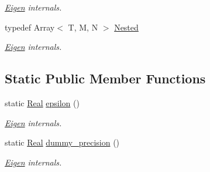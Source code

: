\begin{DoxyCompactItemize}
\begin{DoxyCompactList}\small\item\em \hyperlink{namespace_eigen}{Eigen} internals. \end{DoxyCompactList}\item 
\hypertarget{struct_eigen_1_1_num_traits_3_01_array_3_01_t_00_01_m_00_01_n_01_4_01_4_ae5988a13ff54e94be1f4c785b30ed82b}{typedef Array$<$ T, M, N $>$ \hyperlink{struct_eigen_1_1_num_traits_3_01_array_3_01_t_00_01_m_00_01_n_01_4_01_4_ae5988a13ff54e94be1f4c785b30ed82b}{Nested}}\label{struct_eigen_1_1_num_traits_3_01_array_3_01_t_00_01_m_00_01_n_01_4_01_4_ae5988a13ff54e94be1f4c785b30ed82b}

\begin{DoxyCompactList}\small\item\em \hyperlink{namespace_eigen}{Eigen} internals. \end{DoxyCompactList}\end{DoxyCompactItemize}
\subsection*{Static Public Member Functions}
\begin{DoxyCompactItemize}
\item 
\hypertarget{struct_eigen_1_1_num_traits_3_01_array_3_01_t_00_01_m_00_01_n_01_4_01_4_a34a0f20cd593faa04bf2c821272ab5c1}{static \hyperlink{struct_eigen_1_1_num_traits_3_01_array_3_01_t_00_01_m_00_01_n_01_4_01_4_ac8c09a8007131b0360928599f9060e9e}{Real} \hyperlink{struct_eigen_1_1_num_traits_3_01_array_3_01_t_00_01_m_00_01_n_01_4_01_4_a34a0f20cd593faa04bf2c821272ab5c1}{epsilon} ()}\label{struct_eigen_1_1_num_traits_3_01_array_3_01_t_00_01_m_00_01_n_01_4_01_4_a34a0f20cd593faa04bf2c821272ab5c1}

\begin{DoxyCompactList}\small\item\em \hyperlink{namespace_eigen}{Eigen} internals. \end{DoxyCompactList}\item 
\hypertarget{struct_eigen_1_1_num_traits_3_01_array_3_01_t_00_01_m_00_01_n_01_4_01_4_a60607af8d805c2d0c7963e89128070fc}{static \hyperlink{struct_eigen_1_1_num_traits_3_01_array_3_01_t_00_01_m_00_01_n_01_4_01_4_ac8c09a8007131b0360928599f9060e9e}{Real} \hyperlink{struct_eigen_1_1_num_traits_3_01_array_3_01_t_00_01_m_00_01_n_01_4_01_4_a60607af8d805c2d0c7963e89128070fc}{dummy\-\_\-precision} ()}\label{struct_eigen_1_1_num_traits_3_01_array_3_01_t_00_01_m_00_01_n_01_4_01_4_a60607af8d805c2d0c7963e89128070fc}

\begin{DoxyCompactList}\small\item\em \hyperlink{namespace_eigen}{Eigen} internals. \end{DoxyCompactList}\end{DoxyCompactItemize}


